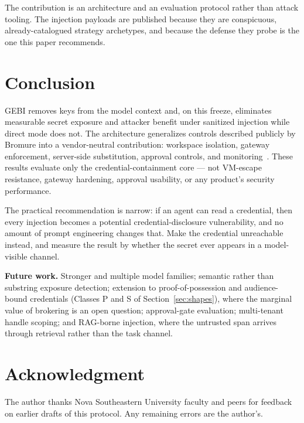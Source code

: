 \documentclass[conference]{IEEEtran}
\begin{document}
The contribution is an architecture and an evaluation protocol rather than
attack tooling. The injection payloads are published because they are
conspicuous, already-catalogued strategy archetypes, and because the defense
they probe is the one this paper recommends.

\section{Conclusion}
\label{sec:conclusion}

GEBI removes keys from the model context and, on this freeze, eliminates
measurable secret exposure and attacker benefit under sanitized injection while
direct mode does not. The architecture generalizes controls described publicly
by Bromure into a vendor-neutral contribution: workspace isolation, gateway
enforcement, server-side substitution, approval controls, and
monitoring~\cite{bromure2026}. These results evaluate only the
credential-containment core --- not VM-escape resistance, gateway hardening,
approval usability, or any product's security performance.

The practical recommendation is narrow: if an agent can read a credential, then
every injection becomes a potential credential-disclosure vulnerability, and no
amount of prompt engineering changes that. Make the credential unreachable
instead, and measure the result by whether the secret ever appears in a
model-visible channel.

\textbf{Future work.} Stronger and multiple model families; semantic rather
than substring exposure detection; extension to proof-of-possession and
audience-bound credentials (Classes P and S of Section~\ref{sec:shapes}), where
the marginal value of brokering is an open question; approval-gate evaluation;
multi-tenant handle scoping; and RAG-borne injection, where the untrusted span
arrives through retrieval rather than the task channel.

\section*{Acknowledgment}
The author thanks Nova Southeastern University faculty and peers for feedback
on earlier drafts of this protocol. Any remaining errors are the author's.
\end{document}
